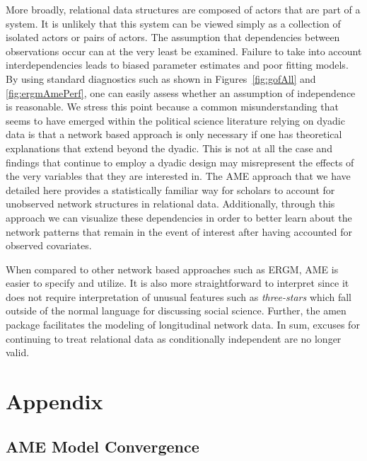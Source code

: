 \documentclass[12pt,pdflatex]{elsarticle}
\newcommand{\pkg}[1]{{\fontseries{b}\selectfont #1}}
\begin{document}
More broadly, relational data structures are composed of actors that are part of a system. It is unlikely that this system can be viewed simply as a collection of isolated actors or pairs of actors. The assumption  that dependencies between observations occur can at the very least be examined. Failure to take into account interdependencies leads to biased parameter estimates and poor fitting models. By using standard diagnostics such as shown in  Figures~\ref{fig:gofAll} and \ref{fig:ergmAmePerf}, one can easily assess whether an assumption of independence is reasonable. We stress this point because a common misunderstanding that seems to have emerged within the political science literature relying on dyadic data is that a network based approach is only necessary if one has theoretical explanations that extend beyond the dyadic. This is not at all the case and findings that continue to employ a dyadic design may misrepresent the effects of the very variables that they are interested in. The AME approach that we have detailed here provides a statistically familiar way for scholars to account for unobserved network structures in relational data. Additionally, through this approach we can visualize these dependencies in order to better learn about the network patterns that remain in the event of interest after having accounted for observed covariates.  

When compared to other network based approaches such as ERGM, AME is easier to specify and utilize. It is also more straightforward to interpret since it does not require interpretation of unusual features such as \textit{three-stars} which fall outside of the normal language for discussing social science. Further, the \pkg{amen} package facilitates the modeling of longitudinal network data. In sum, excuses for continuing to treat relational data as conditionally independent are no longer valid. 

\clearpage

\renewcommand{\thefigure}{A\arabic{figure}}
\setcounter{figure}{0}
\renewcommand{\thetable}{A.\arabic{table}}
\setcounter{table}{0}
\renewcommand{\thesection}{A.\arabic{section}}
\setcounter{section}{0}

\section{\textbf{Appendix}}

\subsection{AME Model Convergence}
\label{sec:ameConvAppendix}
\end{document}
